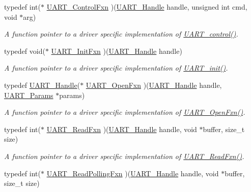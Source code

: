 \begin{DoxyCompactItemize}
typedef int($\ast$ \hyperlink{_u_a_r_t_8h_ae4032cc8e010c6e11793d646de541c24}{U\-A\-R\-T\-\_\-\-Control\-Fxn} )(\hyperlink{_u_a_r_t_8h_a13cc669fae768d8212e6491ce71b28af}{U\-A\-R\-T\-\_\-\-Handle} handle, unsigned int cmd, void $\ast$arg)
\begin{DoxyCompactList}\small\item\em A function pointer to a driver specific implementation of \hyperlink{_u_a_r_t_8h_a9de3c26cfe4ce6b7f350a6ea6e16801d}{U\-A\-R\-T\-\_\-control()}. \end{DoxyCompactList}\item 
typedef void($\ast$ \hyperlink{_u_a_r_t_8h_a07f8e43acf7db146a5585e12ee86a2cf}{U\-A\-R\-T\-\_\-\-Init\-Fxn} )(\hyperlink{_u_a_r_t_8h_a13cc669fae768d8212e6491ce71b28af}{U\-A\-R\-T\-\_\-\-Handle} handle)
\begin{DoxyCompactList}\small\item\em A function pointer to a driver specific implementation of \hyperlink{_u_a_r_t_8h_ab60a36f7295d704926120d22f806dcd1}{U\-A\-R\-T\-\_\-init()}. \end{DoxyCompactList}\item 
typedef \hyperlink{_u_a_r_t_8h_a13cc669fae768d8212e6491ce71b28af}{U\-A\-R\-T\-\_\-\-Handle}($\ast$ \hyperlink{_u_a_r_t_8h_a66aef06e71cd9d94b4baccfa05f60e8a}{U\-A\-R\-T\-\_\-\-Open\-Fxn} )(\hyperlink{_u_a_r_t_8h_a13cc669fae768d8212e6491ce71b28af}{U\-A\-R\-T\-\_\-\-Handle} handle, \hyperlink{struct_u_a_r_t___params}{U\-A\-R\-T\-\_\-\-Params} $\ast$params)
\begin{DoxyCompactList}\small\item\em A function pointer to a driver specific implementation of \hyperlink{_u_a_r_t_8h_a66aef06e71cd9d94b4baccfa05f60e8a}{U\-A\-R\-T\-\_\-\-Open\-Fxn()}. \end{DoxyCompactList}\item 
typedef int($\ast$ \hyperlink{_u_a_r_t_8h_af7763f31e8786639a1a9e468c03dc57f}{U\-A\-R\-T\-\_\-\-Read\-Fxn} )(\hyperlink{_u_a_r_t_8h_a13cc669fae768d8212e6491ce71b28af}{U\-A\-R\-T\-\_\-\-Handle} handle, void $\ast$buffer, size\-\_\-t size)
\begin{DoxyCompactList}\small\item\em A function pointer to a driver specific implementation of \hyperlink{_u_a_r_t_8h_af7763f31e8786639a1a9e468c03dc57f}{U\-A\-R\-T\-\_\-\-Read\-Fxn()}. \end{DoxyCompactList}\item 
typedef int($\ast$ \hyperlink{_u_a_r_t_8h_a0528ac54e13ccc7be4a35e07a09196cb}{U\-A\-R\-T\-\_\-\-Read\-Polling\-Fxn} )(\hyperlink{_u_a_r_t_8h_a13cc669fae768d8212e6491ce71b28af}{U\-A\-R\-T\-\_\-\-Handle} handle, void $\ast$buffer, size\-\_\-t size)

\end{DoxyCompactItemize}
